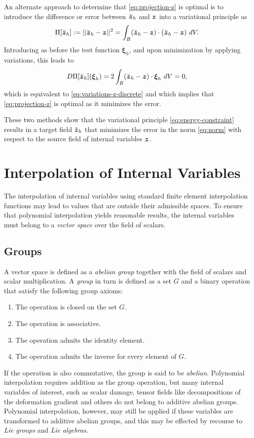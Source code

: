 \documentclass[12pt]{article}
\newcommand{\mbs}[1]{\boldsymbol{#1}}
\def\bxi{{\mbs{\xi}}}
\begin{document}
An alternate approach to determine that \eqref{eq:projection-z} is
optimal is to introduce the difference or error between $\bar{\bz}_h$
and $\bz$ into a variational principle as
\begin{equation}
  \Pi[\bar{\bz}_h] :=
  ||\bar{\bz}_h - \bz||^2
  =
  \int_B (\bar{\bz}_h - \bz) \cdot (\bar{\bz}_h - \bz) \ dV.
  \label{eq:error-functional}
\end{equation}
Introducing as before the test function $\bxi_h$, and upon
minimization by applying variations, this leads to
\begin{equation}
  D\Pi[\bar{\bz}_h](\bxi_h) =
  2 \int_B (\bar{\bz}_h - \bz) \cdot \bxi_h \ dV = 0,
  \label{eq:error-discrete-statement}
\end{equation}
which is equivalent to \eqref{eq:variations-z-discrete} and which
implies that \eqref{eq:projection-z} is optimal as it minimizes the
error.

These two methods show that the variational principle
\eqref{eq:energy-constraint} results in a target field $\bar{\bz}_h$
that minimizes the error in the norm \eqref{eq:norm} with respect to
the source field of internal variables $\bz$.

\section{Interpolation of Internal Variables}
\label{sec:interpolation}

The interpolation of internal variables using standard finite element
interpolation functions may lead to values that are outside their admissible
spaces. To ensure that polynomial interpolation yields reasonable results, the
internal variables must belong to a \emph{vector space} over the field of
scalars.

\subsection{Groups}

A vector space is defined as a \emph{abelian group} together with the
field of scalars and scalar multiplication. A \emph{group} in turn is defined as
a set $G$ and a binary operation that satisfy the following group axioms:
\begin{enumerate}
  \item The operation is closed on the set $G$.
  \item The operation is associative.
  \item The operation admits the identity element.
  \item The operation admits the inverse for every element of $G$.
\end{enumerate}
If the operation is also commutative, the group is said to be
\emph{abelian}. Polynomial interpolation requires addition as the
group operation, but many internal variables of interest, such as
scalar damage, tensor fields like decompositions of the deformation gradient
and others do not belong to additive abelian groups.
Polynomial interpolation, however, may still be applied if these variables are
transformed to additive abelian groups, and this may be effected by recourse to
\emph{Lie groups} and \emph{Lie algebras}.
\end{document}
